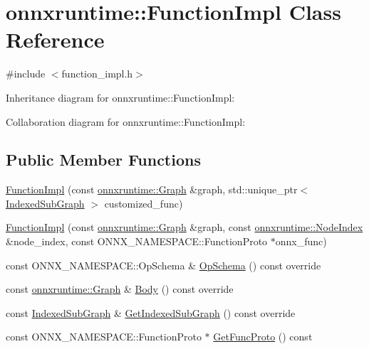 \hypertarget{classonnxruntime_1_1FunctionImpl}{}\section{onnxruntime\+:\+:Function\+Impl Class Reference}
\label{classonnxruntime_1_1FunctionImpl}


{\ttfamily \#include $<$function\+\_\+impl.\+h$>$}



Inheritance diagram for onnxruntime\+:\+:Function\+Impl\+:


Collaboration diagram for onnxruntime\+:\+:Function\+Impl\+:
\subsection*{Public Member Functions}
\begin{DoxyCompactItemize}
\item 
\mbox{\hyperlink{classonnxruntime_1_1FunctionImpl_a897e215474de502ee1cd211563b7ddea}{Function\+Impl}} (const \mbox{\hyperlink{classonnxruntime_1_1Graph}{onnxruntime\+::\+Graph}} \&graph, std\+::unique\+\_\+ptr$<$ \mbox{\hyperlink{structonnxruntime_1_1IndexedSubGraph}{Indexed\+Sub\+Graph}} $>$ customized\+\_\+func)
\item 
\mbox{\hyperlink{classonnxruntime_1_1FunctionImpl_ae08b81d4d3b431fd36ff839ca6c94bbc}{Function\+Impl}} (const \mbox{\hyperlink{classonnxruntime_1_1Graph}{onnxruntime\+::\+Graph}} \&graph, const \mbox{\hyperlink{namespaceonnxruntime_af8773b5c12b5d8fd9292eb2e268df760}{onnxruntime\+::\+Node\+Index}} \&node\+\_\+index, const O\+N\+N\+X\+\_\+\+N\+A\+M\+E\+S\+P\+A\+C\+E\+::\+Function\+Proto $\ast$onnx\+\_\+func)
\item 
const O\+N\+N\+X\+\_\+\+N\+A\+M\+E\+S\+P\+A\+C\+E\+::\+Op\+Schema \& \mbox{\hyperlink{classonnxruntime_1_1FunctionImpl_ad003c6cab0d96bd8cd96d2bb5abfce50}{Op\+Schema}} () const override
\item 
const \mbox{\hyperlink{classonnxruntime_1_1Graph}{onnxruntime\+::\+Graph}} \& \mbox{\hyperlink{classonnxruntime_1_1FunctionImpl_a151af57e5850f431b6aedba554153305}{Body}} () const override
\item 
const \mbox{\hyperlink{structonnxruntime_1_1IndexedSubGraph}{Indexed\+Sub\+Graph}} \& \mbox{\hyperlink{classonnxruntime_1_1FunctionImpl_a97e5a25ac521423dbe59501f6b7fd2c1}{Get\+Indexed\+Sub\+Graph}} () const override
\item 
const O\+N\+N\+X\+\_\+\+N\+A\+M\+E\+S\+P\+A\+C\+E\+::\+Function\+Proto $\ast$ \mbox{\hyperlink{classonnxruntime_1_1FunctionImpl_aaf0312803c104475ef243202cc648191}{Get\+Func\+Proto}} () const
\end{DoxyCompactItemize}


